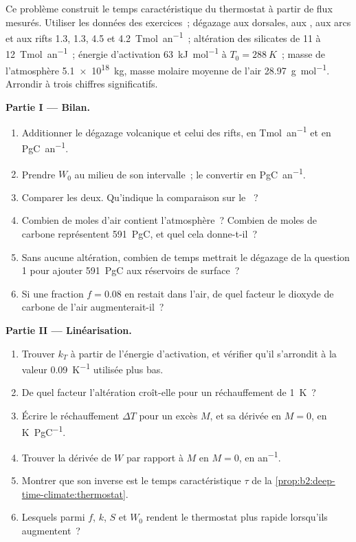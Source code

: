 \begin{problem}\label{pb:b2:deep-time-climate:1}
Ce problème construit le temps caractéristique du thermostat à partir de flux mesurés. Utiliser les données des
exercices~; dégazage aux dorsales, aux , aux arcs et aux rifts \num{1.3}, \num{1.3}, 4.5 et
\qty{4.2}{Tmol.an^{-1}}~; altération des silicates de 11 à \qty{12}{Tmol.an^{-1}}~; énergie d'activation
\qty{63}{kJ.mol^{-1}} à $T_0 = \qty{288}{K}$~; masse de l'atmosphère \qty{5.1e18}{kg}, masse molaire moyenne
de l'air \qty{28.97}{g.mol^{-1}}. Arrondir à trois chiffres significatifs.

\noindent\textbf{Partie I --- Bilan.}
\begin{enumerate}
  \item Additionner le dégazage volcanique et celui des rifts, en \unit{Tmol.an^{-1}} et en \unit{PgC.an^{-1}}.
  \item Prendre $W_0$ au milieu de son intervalle~; le convertir en \unit{PgC.an^{-1}}.
  \item Comparer les deux. Qu'indique la comparaison sur le ~?
  \item Combien de moles d'air contient l'atmosphère~? Combien de moles de carbone représentent \qty{591}{PgC},
        et quel  cela donne-t-il~?
  \item Sans aucune altération, combien de temps mettrait le dégazage de la question 1 pour ajouter
        \qty{591}{PgC} aux réservoirs de surface~?
  \item Si une fraction $f = 0.08$ en restait dans l'air, de quel facteur le dioxyde de carbone de l'air
        augmenterait-il~?
\end{enumerate}

\noindent\textbf{Partie II --- Linéarisation.}
\begin{enumerate}[resume]
  \item Trouver $k_T$ à partir de l'énergie d'activation, et vérifier qu'il s'arrondit à la
        valeur \qty{0.09}{K^{-1}} utilisée plus bas.
  \item De quel facteur l'altération croît-elle pour un réchauffement de \qty{1}{K}~?
  \item Écrire le réchauffement $\Delta T$ pour un excès $M$, et sa dérivée en $M = 0$, en
        \unit{K.PgC^{-1}}.
  \item Trouver la dérivée de $W$ par rapport à $M$ en $M = 0$, en \unit{an^{-1}}.
  \item Montrer que son inverse est le temps caractéristique $\tau$ de la
        \cref{prop:b2:deep-time-climate:thermostat}.
  \item Lesquels parmi $f$, $k$, $S$ et $W_0$ rendent le thermostat plus rapide lorsqu'ils augmentent~?
\end{enumerate}


\end{problem}
